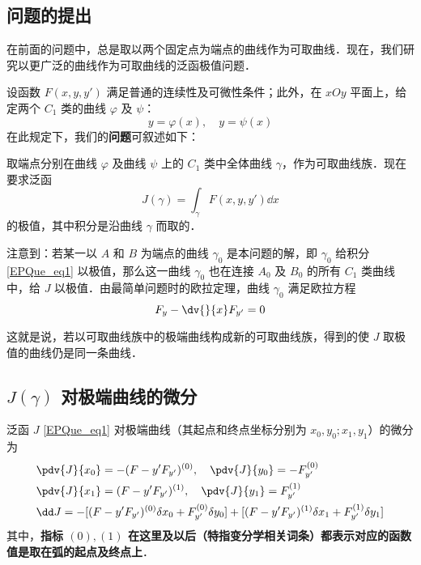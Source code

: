 

\subsection{问题的提出}\label{EPQue_sub1}在前面的问题中，总是取以两个固定点为端点的曲线作为可取曲线．现在，我们研究以更广泛的曲线作为可取曲线的泛函极值问题．

设函数 $F(x,y,y')$ 满足普通的连续性及可微性条件；此外，在 $xOy$ 平面上，给定两个 $C_1$ 类的曲线 $\varphi$ 及 $\psi$：
\begin{equation}
y=\varphi(x),\quad y=\psi(x)
\end{equation}
在此规定下，我们的\textbf{问题}可叙述如下：

取端点分别在曲线 $\varphi$ 及曲线 $\psi$ 上的 $C_1$ 类中全体曲线 $\gamma$，作为可取曲线族．现在要求泛函
\begin{equation}\label{EPQue_eq1}
J(\gamma)=\int_\gamma F(x,y,y')\dd x
\end{equation}
的极值，其中积分是沿曲线 $\gamma$ 而取的．

注意到：若某一以 $A$ 和 $B$ 为端点的曲线 $\gamma_0$ 是本问题的解，即 $\gamma_0$ 给积分\autoref{EPQue_eq1} 以极值，那么这一曲线 $\gamma_0$ 也在连接 $A_0$ 及 $B_0$ 的所有 $C_1$ 类曲线中，给 $J$ 以极值．由最简单问题时的欧拉定理，曲线 $\gamma_0$ 满足欧拉方程
\begin{equation}
F_y-\dv{}{x}F_{y'}=0
\end{equation}

这就是说，若以可取曲线族中的极端曲线构成新的可取曲线族，得到的使 $J$ 取极值的曲线仍是同一条曲线．
\subsection{$J(\gamma)$ 对极端曲线的微分} 
\begin{theorem}{}\label{EPQue_the1}
泛函 $J$ \autoref{EPQue_eq1} 对极端曲线（其起点和终点坐标分别为 $x_0,y_0;x_1,y_1$）的微分为
\begin{equation}\label{EPQue_eq5}
\begin{aligned}
&\pdv{J}{x_0}=-(F-y'F_{y'})^{(0)},\quad \pdv{J}{y_0}=-F_{y'}^{(0)}\\
&\pdv{J}{x_1}=(F-y'F_{y'})^{(1)},\quad \pdv{J}{y_1}=F_{y'}^{(1)}\\
&\dd J=-[(F-y'F_{y'})^{(0)}\delta {x_0}+ F_{y'}^{(0)}\delta y_0]+[(F-y'F_{y'})^{(1)}\delta {x_1}+F_{y'}^{(1)}\delta y_1]
\end{aligned}
\end{equation}
其中，\textbf{指标 ${(0)},{(1)}$ 在这里及以后（特指变分学相关词条）都表示对应的函数值是取在弧的起点及终点上}．
\end{theorem}
